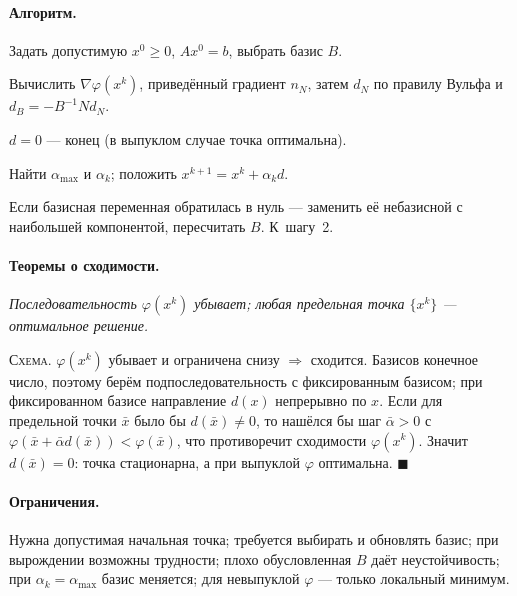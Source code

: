 \paragraph{Алгоритм.}
\begin{csteps}
  \item Задать допустимую $x^0 \ge 0$, $Ax^0 = b$, выбрать базис $B$.
  \item Вычислить $\nabla\varphi(x^k)$, приведённый градиент $n_N$, затем
        $d_N$ по правилу Вульфа и $d_B = -B^{-1}Nd_N$.
  \item $d = 0$ — конец (в выпуклом случае точка оптимальна).
  \item Найти $\alpha_{\max}$ и $\alpha_k$; положить
        $x^{k+1} = x^k + \alpha_k d$.
  \item Если базисная переменная обратилась в нуль — заменить её небазисной с
        наибольшей компонентой, пересчитать $B$. К~шагу~2.
\end{csteps}

\paragraph{Теоремы о сходимости.}
\textit{Последовательность $\varphi(x^k)$ убывает; любая предельная точка
$\{x^k\}$ — оптимальное решение.}

\textsc{Схема.} $\varphi(x^k)$ убывает и ограничена снизу $\Rightarrow$
сходится. Базисов конечное число, поэтому берём подпоследовательность с
фиксированным базисом; при фиксированном базисе направление $d(x)$ непрерывно
по $x$. Если для предельной точки $\bar{x}$ было бы $d(\bar{x}) \ne 0$, то
нашёлся бы шаг $\bar\alpha > 0$ с
$\varphi(\bar{x}+\bar\alpha d(\bar{x})) < \varphi(\bar{x})$, что противоречит
сходимости $\varphi(x^k)$. Значит $d(\bar{x}) = 0$: точка стационарна, а при
выпуклой $\varphi$ оптимальна. $\blacksquare$

\paragraph{Ограничения.}
Нужна допустимая начальная точка; требуется выбирать и обновлять базис; при
вырождении возможны трудности; плохо обусловленная $B$ даёт неустойчивость;
при $\alpha_k = \alpha_{\max}$ базис меняется; для невыпуклой $\varphi$ —
только локальный минимум.

